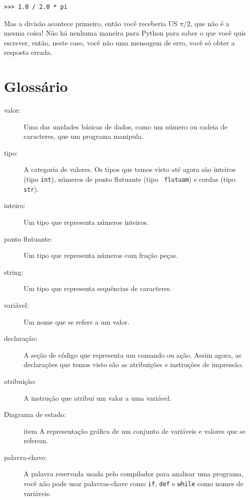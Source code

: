 \documentclass[10pt]{book}
\begin{document}
\begin{verbatim}
>>> 1.0 / 2.0 * pi
\end{verbatim}
%
Mas a divisão acontece primeiro, então você receberia US $\pi / 2$, que
não é a mesma coisa! Não há nenhuma maneira para Python
para saber o que você quis escrever, então, neste caso, você não
uma mensagem de erro, você só obter a resposta errada.


\section{Glossário}

\begin{description}

\item[valor:] Uma das unidades básicas de dados, como um número ou cadeia de caracteres, 
que um programa manipula.

\item[tipo:] A categoria de valores. Os tipos que temos visto até agora
são inteiros (tipo {\tt int}), números de ponto flutuante (tipo {\tt
flutuam}) e cordas (tipo {\tt str}).

\item[inteiro:] Um tipo que representa números inteiros.

\item[ponto flutuante:] Um tipo que representa números com fração
peças.

\item[string:] Um tipo que representa sequências de caracteres.

\item[variável:] Um nome que se refere a um valor.

\item[declaração:] A seção de código que representa um comando ou ação. Assim
agora, as declarações que temos visto são as atribuições e instruções de impressão.

\item[atribuição:] A instrução que atribui um valor a uma variável.

\item[Diagrama de estado:] item A representação gráfica de um conjunto de variáveis ​​e
valores que se referem.

\item[palavra-chave:] A palavra reservada usada pelo compilador para analisar uma
programa, você não pode usar palavras-chave como {\tt if}, {\tt def} e {\tt while} como
nomes de variáveis.


\end{description}
\end{document}
